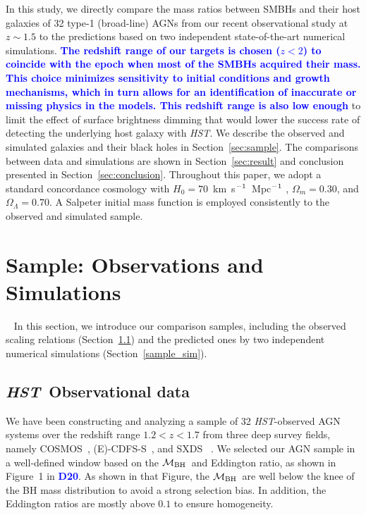 \documentclass[twocolumn,trackchanges]{aastex63}
\newcommand{\hst}{{\it HST}}
\newcommand{\mbh}{$\mathcal M_{\rm BH}$}
\newcommand{\kmsMpc}{km~s$^{\rm -1}$~Mpc$^{\rm -1}$}
\newcommand{\blue}[1]{{\textcolor{blue}{\bf #1}}}
\begin{document}
In this study, we directly compare the mass ratios between SMBHs and their host galaxies of 32 type-1 (broad-line) AGNs from our recent observational study at $z\sim1.5$ \citep{Ding2020} to the predictions based on two independent state-of-the-art numerical simulations. \blue{The redshift range of our targets is chosen ($z<2$) to coincide with the epoch when most of the SMBHs acquired their mass. This choice minimizes sensitivity to initial conditions and growth mechanisms, which in turn allows for an identification of inaccurate or missing physics in the models. This redshift range is also low enough} to limit the effect of surface brightness dimming that would lower the success rate of detecting the underlying host galaxy with \hst. We describe the observed and simulated galaxies and their black holes in Section~\ref{sec:sample}. The comparisons between data and simulations are shown in Section~\ref{sec:result} and conclusion presented in Section~\ref{sec:conclusion}. Throughout this paper, we adopt a standard concordance
cosmology with $H_0 = 70$~\kmsMpc
, $\Omega_m = 0.30$,
and $\Omega_\Lambda = 0.70$. A Salpeter initial mass function is employed consistently to the
observed and simulated sample.


\section{Sample: Observations and Simulations}~\label{sec:sample}
In this section, we introduce our comparison samples, including the observed scaling relations (Section~\ref{hst_sample}) and the predicted ones by two independent numerical simulations (Section~\ref{sample_sim}).
	
\subsection{\hst\ Observational data}\label{hst_sample}
	
We have been constructing and analyzing a sample of 32 \hst-observed AGN systems over the redshift range $1.2<z<1.7$ from three deep survey fields, namely COSMOS~\citep{Civano2016}, (E)-CDFS-S~\citep{Lehmer2005, Xue2011}, and SXDS~\citep{Ueda2008} \citep[][\blue{hereafter D20}]{Ding2020}.
We selected our AGN sample in a well-defined window based on the \mbh\ and Eddington ratio, as shown in Figure~1 in \blue{D20}. As shown in that Figure, the \mbh\ are well below the knee of the BH mass distribution to avoid a strong selection bias. In addition, the Eddington ratios are mostly above $0.1$ to ensure homogeneity.
\end{document}
